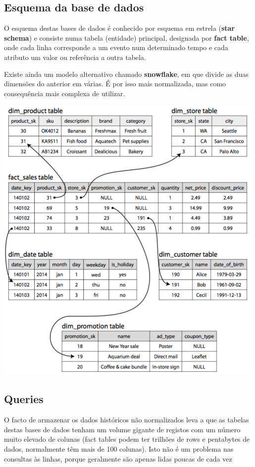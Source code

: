 \documentclass{article}
\begin{document}
\pagebreak

\subsection{Esquema da base de dados}

O esquema destas bases de dados é conhecido por esquema em estrela (\textbf{star schema}) e consiste numa
tabela (entidade) principal, designada por \textbf{fact table}, onde cada linha corresponde a um evento num determinado tempo e cada
atributo um valor ou referência a outra tabela.

Existe ainda um modelo alternativo chamado \textbf{snowflake}, em que divide as duas dimensões do
anterior em várias. É por isso mais normalizada, mas como consequência mais complexa de
utilizar. 

\begin{center}
  \includegraphics[scale=0.3]{50}
\end{center}

\subsection{Queries}

O facto de armazenar os dados históricos não normalizados leva a que as tabelas destas bases
de dados tenham um volume gigante de registos com um número muito elevado de colunas (fact tables
podem ter trilhões de rows e pentabytes de dados, normalmente têm mais de 100 colunas).
Isto não é um problema nas consultas às linhas, porque geralmente são apenas lidas poucas
de cada vez
\end{document}
